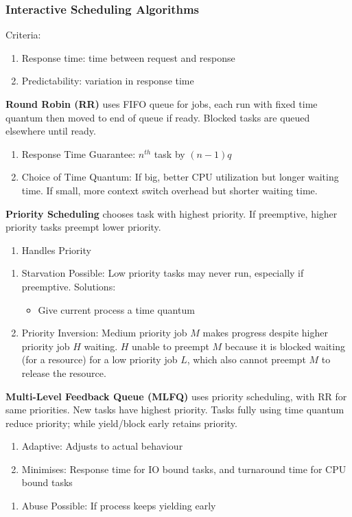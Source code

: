\documentclass[12pt, a4paper]{article}
\begin{document}
\begin{multicols*}{3}
\subsubsection{Interactive Scheduling Algorithms}
Criteria:
\begin{enumerate}[\roman*.]
  \item Response time: time between request and response
  \item Predictability: variation in response time
\end{enumerate}

\textbf{Round Robin (RR)} uses FIFO queue for jobs, each run with fixed time quantum then moved to end of queue if ready. Blocked tasks are queued elsewhere until ready.
\begin{enumerate}[\roman*.]
  \item Response Time Guarantee: $n^{th}$ task by $(n-1)q$
  \item Choice of Time Quantum: If big, better CPU utilization but longer waiting time. If small, more context switch overhead but shorter waiting time. 
\end{enumerate}

\textbf{Priority Scheduling} chooses task with highest priority. If preemptive, higher priority tasks preempt lower priority.
\begin{enumerate}[$+$]
  \item Handles Priority 
\end{enumerate}\vspace{-1pt}
\begin{enumerate}[$-$]
  \item Starvation Possible: Low priority tasks may never run, especially if preemptive. Solutions:
    \begin{itemize}[leftmargin=*]
      \item Give current process a time quantum
    \end{itemize}
  \item Priority Inversion: Medium priority job $M$ makes progress despite higher priority job $H$ waiting. $H$ unable to preempt $M$ because it is blocked waiting (for a resource) for a low priority job $L$, which also cannot preempt $M$ to release the resource. 
\end{enumerate}

\textbf{Multi-Level Feedback Queue (MLFQ)} uses priority scheduling, with RR for same priorities. New tasks have highest priority. Tasks fully using time quantum reduce priority; while yield/block early retains priority. 
\begin{enumerate}[$+$]
  \item Adaptive: Adjusts to actual behaviour
  \item Minimises: Response time for IO bound tasks, and turnaround time for CPU bound tasks
\end{enumerate}\vspace{-1pt}
\begin{enumerate}[$-$]
  \item Abuse Possible: If process keeps yielding early
\end{enumerate}


\end{multicols*}
\end{document}

